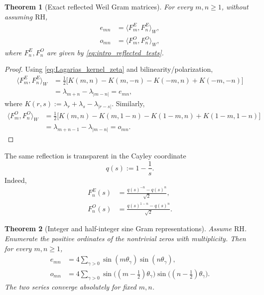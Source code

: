 \documentclass[preprint,12pt]{elsarticle}
\numberwithin{equation}{section}
\theoremstyle{plain}
\newtheorem{theorem}{Theorem}[section]
\theoremstyle{definition}
\theoremstyle{remark}
\newcommand{\RH}{\mathrm{RH}}
\begin{document}
\begin{theorem}[Exact reflected Weil Gram matrices]
\label{thm:exact_Weil_reflection}
For every $m,n\ge1$, without assuming $\RH$,
\begin{align}
e_{mn}
&=\langle F_m^E,F_n^E\rangle_W,
\label{eq:E_exact_Weil_Gram}\\
o_{mn}
&=\langle F_m^O,F_n^O\rangle_W,
\label{eq:O_exact_Weil_Gram}
\end{align}
where $F_n^E,F_n^O$ are given by \eqref{eq:intro_reflected_tests}.
\end{theorem}

\begin{proof}
Using \eqref{eq:Lagarias_kernel_zeta} and bilinearity/polarization,
\begin{align}
\langle F_m^E,F_n^E\rangle_W
&=\frac12\bigl[
K(m,n)-K(m,-n)-K(-m,n)+K(-m,-n)
\bigr]
\label{eq:E_exact_polarization}\\
&=\lambda_{m+n}-\lambda_{|m-n|}=e_{mn},
\label{eq:E_exact_polarization_result}
\end{align}
where $K(r,s):=\lambda_r+\lambda_s-\lambda_{|r-s|}$. Similarly,
\begin{align}
\langle F_m^O,F_n^O\rangle_W
&=\frac12\bigl[
K(m,n)-K(m,1-n)-K(1-m,n)+K(1-m,1-n)
\bigr]
\label{eq:O_exact_polarization}\\
&=\lambda_{m+n-1}-\lambda_{|m-n|}=o_{mn}.
\label{eq:O_exact_polarization_result}
\end{align}
\end{proof}

The same reflection is transparent in the Cayley coordinate
\begin{equation}
q(s):=1-\frac1s.
\label{eq:q_coordinate}
\end{equation}
Indeed,
\begin{align}
F_n^E(s)
&=\frac{q(s)^{-n}-q(s)^n}{\sqrt2},
\label{eq:FE_q_form}\\
F_n^O(s)
&=\frac{q(s)^{1-n}-q(s)^n}{\sqrt2}.
\label{eq:FO_q_form}
\end{align}

\begin{theorem}[Integer and half-integer sine Gram representations]
\label{thm:gram_representations}
Assume $\RH$. Enumerate the positive ordinates of the nontrivial zeros with multiplicity. Then for every $m,n\ge1$,
\begin{align}
e_{mn}
&=4\sum_{\gamma>0}
\sin(m\theta_\gamma)\sin(n\theta_\gamma),
\label{eq:E_gram}\\
o_{mn}
&=4\sum_{\gamma>0}
\sin\bigl((m-\tfrac12)\theta_\gamma\bigr)
\sin\bigl((n-\tfrac12)\theta_\gamma\bigr).
\label{eq:O_gram}
\end{align}
The two series converge absolutely for fixed $m,n$.
\end{theorem}
\end{document}
